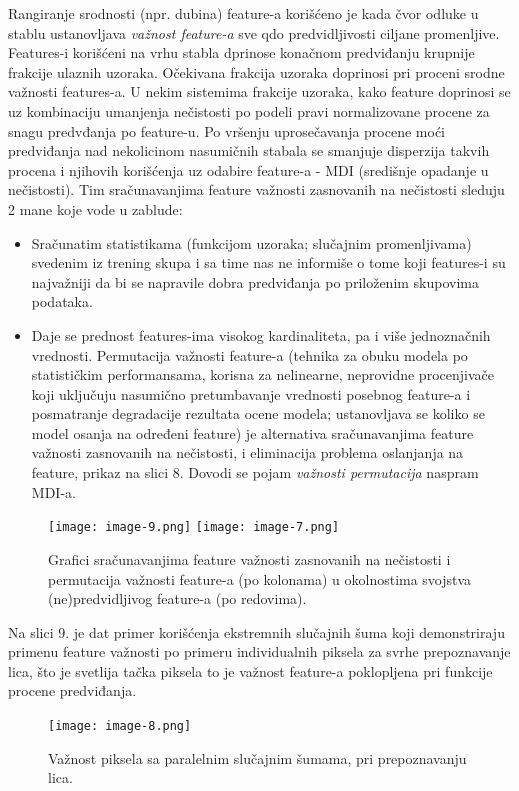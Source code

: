 \documentclass[fontsize=12bp, paper=a4]{scrarticle}
\begin{document}
Rangiranje srodnosti (npr. dubina) feature-a korišćeno je kada čvor odluke u stablu ustanovljava \textit{važnost feature-a} sve qdo predvidljivosti ciljane promenljive. Features-i korišćeni na vrhu stabla dprinose konačnom predviđanju krupnije frakcije ulaznih uzoraka. Očekivana frakcija uzoraka doprinosi pri proceni srodne važnosti features-a. U nekim sistemima frakcije uzoraka, kako feature doprinosi se uz kombinaciju umanjenja nečistosti po podeli pravi normalizovane procene za snagu predvđanja po feature-u. Po vršenju uprosečavanja procene moći predviđanja nad nekolicinom nasumičnih stabala se smanjuje disperzija takvih procena i njihovih korišćenja uz odabire feature-a - MDI (središnje opadanje u nečistosti).
Tim sračunavanjima feature važnosti zasnovanih na nečistosti sleduju 2 mane koje vode u zablude:
\begin{itemize}
    \item Sračunatim statistikama (funkcijom uzoraka; slučajnim promenljivama) svedenim iz trening skupa i sa time nas ne informiše o tome koji features-i su najvažniji da bi se napravile dobra predviđanja po priloženim skupovima podataka.
    \item Daje se prednost features-ima visokog kardinaliteta, pa i više jednoznačnih vrednosti. Permutacija važnosti feature-a (tehnika za obuku modela po statističkim performansama, korisna za nelinearne, neprovidne procenjivače koji uključuju nasumično pretumbavanje vrednosti posebnog feature-a i posmatranje degradacije rezultata ocene modela; ustanovljava se koliko se model osanja na određeni feature)\cite{permutation} je alternativa sračunavanjima feature važnosti zasnovanih na nečistosti, i eliminacija problema oslanjanja na feature, prikaz na slici 8. Dovodi se pojam \textit{važnosti permutacija} naspram MDI-a.
\end{itemize}
    \begin{figure}[h!]
        \centering
        \texttt{[image: image-9.png]}
        \texttt{[image: image-7.png]}
        \caption{Grafici sračunavanjima feature važnosti zasnovanih na nečistosti i permutacija važnosti feature-a (po kolonama) u okolnostima svojstva (ne)predvidljivog feature-a (po redovima).}
    \end{figure}
    
    Na slici 9. je dat primer korišćenja ekstremnih slučajnih šuma koji demonstriraju primenu feature važnosti po primeru individualnih piksela za svrhe prepoznavanje lica, što je svetlija tačka piksela to je važnost feature-a poklopljena pri funkcije procene predviđanja.
    \begin{figure}[h!]
        \centering
        \texttt{[image: image-8.png]}
        \caption{Važnost piksela sa paralelnim slučajnim šumama, pri prepoznavanju lica.}
    \end{figure}
\end{document}
